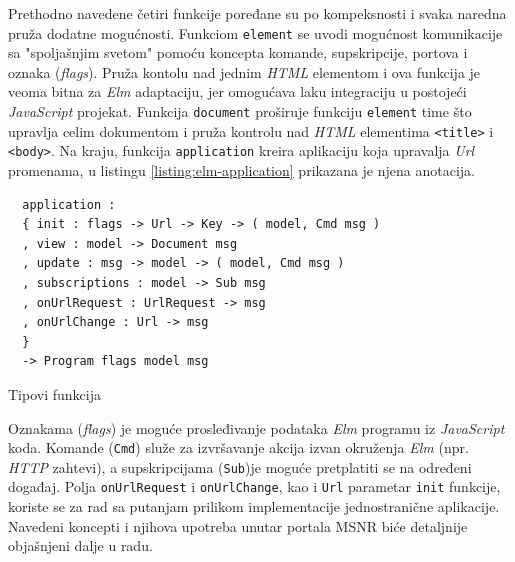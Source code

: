 \documentclass[12pt,oneside]{memoir}
\begin{document}
Prethodno navedene četiri funkcije poređane su po kompeksnosti i svaka naredna pruža dodatne mogućnosti.
Funkciom \texttt{element} se uvodi mogućnost komunikacije sa "spoljašnjim svetom" pomoću koncepta komande, supskripcije, portova
i oznaka (\emph{flags}). Pruža kontolu nad jednim \emph{HTML} elementom i ova funkcija je veoma bitna za \emph{Elm} adaptaciju,
jer omogućava laku integraciju u postojeći \emph{JavaScript} projekat. 
Funkcija \texttt{document} proširuje funkciju \texttt{element} time što upravlja celim dokumentom i pruža kontrolu nad \emph{HTML} elementima \texttt{<title>}
i \texttt{<body>}. Na kraju, funkcija \texttt{application} kreira aplikaciju koja upravalja \emph{Url} promenama, u listingu
\ref{listing:elm-application} prikazana je njena anotacija. 
\begin{listing}[h]
\begin{verbatim}
  application :
  { init : flags -> Url -> Key -> ( model, Cmd msg )
  , view : model -> Document msg
  , update : msg -> model -> ( model, Cmd msg )
  , subscriptions : model -> Sub msg
  , onUrlRequest : UrlRequest -> msg
  , onUrlChange : Url -> msg
  }
  -> Program flags model msg
\end{verbatim}
\caption{Tipovi funkcija}
\label{listing:elm-application}
\end{listing} 

Oznakama (\emph{flags}) je moguće prosleđivanje podataka \emph{Elm} programu iz \emph{JavaScript} koda.
Komande (\texttt{Cmd}) služe za izvršavanje akcija izvan okruženja \emph{Elm} (npr. \emph{HTTP} zahtevi), a supskripcijama
(\texttt{Sub})je moguće pretplatiti se na određeni događaj. Polja \texttt{onUrlRequest} i \texttt{onUrlChange}, kao i
\texttt{Url} parametar \texttt{init} funkcije, koriste se za rad sa putanjam prilikom implementacije jednostranične aplikacije.
Navedeni koncepti i njihova upotreba unutar portala MSNR biće detaljnije objašnjeni dalje u radu.
\end{document}

